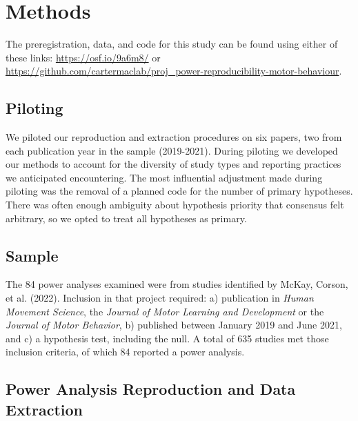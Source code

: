 \documentclass[
  doc, donotrepeattitle,floatsintext]{apa7}
\begin{document}
\hypertarget{methods}{%
\section{Methods}\label{methods}}

The preregistration, data, and code for this study can be found using either of these links: \url{https://osf.io/9a6m8/} or \url{https://github.com/cartermaclab/proj_power-reproducibility-motor-behaviour}.

\hypertarget{piloting}{%
\subsection{Piloting}\label{piloting}}

We piloted our reproduction and extraction procedures on six papers, two from each publication year in the sample (2019-2021). During piloting we developed our methods to account for the diversity of study types and reporting practices we anticipated encountering. The most influential adjustment made during piloting was the removal of a planned code for the number of primary hypotheses. There was often enough ambiguity about hypothesis priority that consensus felt arbitrary, so we opted to treat all hypotheses as primary.

\hypertarget{sample}{%
\subsection{Sample}\label{sample}}

The 84 power analyses examined were from studies identified by McKay, Corson, et al. (2022). Inclusion in that project required: a) publication in \emph{Human Movement Science}, the \emph{Journal of Motor Learning and Development} or the \emph{Journal of Motor Behavior}, b) published between January 2019 and June 2021, and c) a hypothesis test, including the null. A total of 635 studies met those inclusion criteria, of which 84 reported a power analysis.

\hypertarget{power-analysis-reproduction-and-data-extraction}{%
\subsection{Power Analysis Reproduction and Data Extraction}\label{power-analysis-reproduction-and-data-extraction}}
\end{document}
